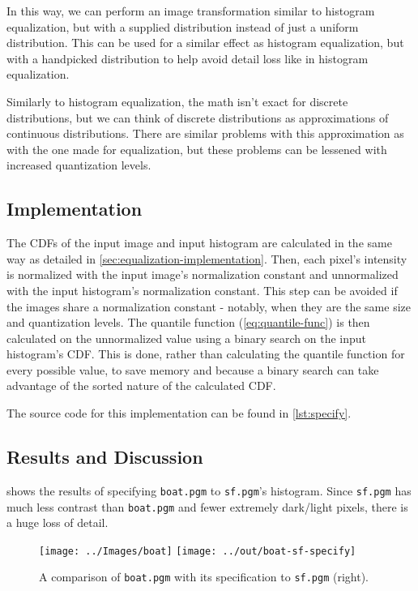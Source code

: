 \documentclass[headings=optiontoheadandtoc,listof=totoc,parskip=full]{scrartcl}
\begin{document}
In this way, we can perform an image transformation similar to histogram equalization, but with a supplied distribution instead of just a uniform distribution. This can be used for a similar effect as histogram equalization, but with a handpicked distribution to help avoid detail loss like in histogram equalization.\par

Similarly to histogram equalization, the math isn't exact for discrete distributions, but we can think of discrete distributions as approximations of continuous distributions. There are similar problems with this approximation as with the one made for equalization, but these problems can be lessened with increased quantization levels.

\subsection{Implementation}

The CDFs of the input image and input histogram are calculated in the same way as detailed in \cref{sec:equalization-implementation}. Then, each pixel's intensity is normalized with the input image's normalization constant and unnormalized with the input histogram's normalization constant. This step can be avoided if the images share a normalization constant - notably, when they are the same size and quantization levels. The quantile function (\cref{eq:quantile-func}) is then calculated on the unnormalized value using a binary search on the input histogram's CDF. This is done, rather than calculating the quantile function for every possible value, to save memory and because a binary search can take advantage of the sorted nature of the calculated CDF. \par

The source code for this implementation can be found in \cref{lst:specify}.

\subsection{Results and Discussion}
\label{sec:specification-results}

 shows the results of specifying \texttt{boat.pgm} to \texttt{sf.pgm}'s histogram. Since \texttt{sf.pgm} has much less contrast than \texttt{boat.pgm} and fewer extremely dark/light pixels, there is a huge loss of detail.

\begin{figure}[H]
	\centering
	\texttt{[image: ../Images/boat]}
	\texttt{[image: ../out/boat-sf-specify]}
	\caption{A comparison of \texttt{boat.pgm} with its specification to \texttt{sf.pgm} (right).}
	\label{fig:specify-result-1}
\end{figure}
\end{document}
